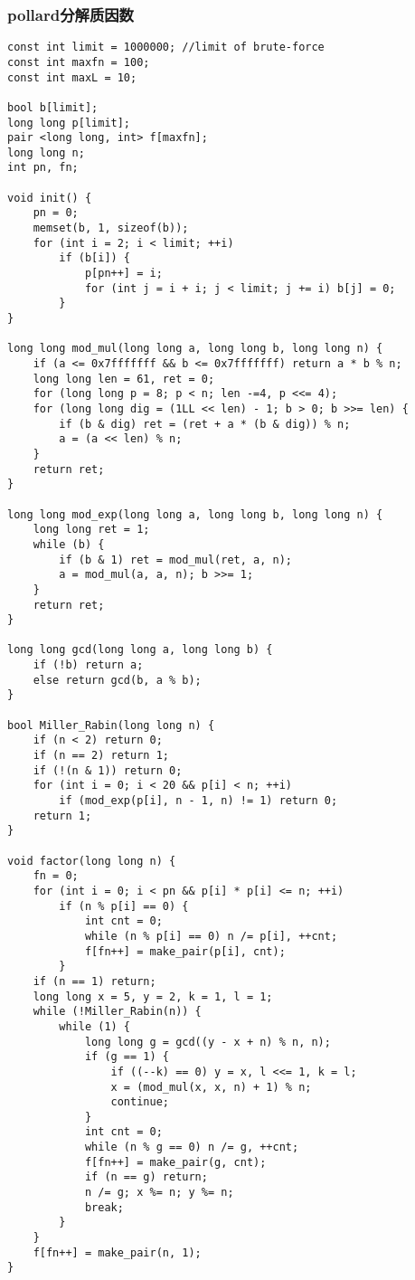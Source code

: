 \subsubsection{pollard分解质因数}
\begin{verbatim}
const int limit = 1000000; //limit of brute-force
const int maxfn = 100;
const int maxL = 10;

bool b[limit];
long long p[limit];
pair <long long, int> f[maxfn];
long long n;
int pn, fn;

void init() {
    pn = 0;
    memset(b, 1, sizeof(b));
    for (int i = 2; i < limit; ++i)
        if (b[i]) {
            p[pn++] = i;
            for (int j = i + i; j < limit; j += i) b[j] = 0;
        }
}

long long mod_mul(long long a, long long b, long long n) {
    if (a <= 0x7fffffff && b <= 0x7fffffff) return a * b % n;
    long long len = 61, ret = 0;
    for (long long p = 8; p < n; len -=4, p <<= 4);
    for (long long dig = (1LL << len) - 1; b > 0; b >>= len) {
        if (b & dig) ret = (ret + a * (b & dig)) % n;
        a = (a << len) % n;
    }
    return ret;
}

long long mod_exp(long long a, long long b, long long n) {
    long long ret = 1;
    while (b) {
        if (b & 1) ret = mod_mul(ret, a, n);
        a = mod_mul(a, a, n); b >>= 1;
    }
    return ret;
}

long long gcd(long long a, long long b) {
    if (!b) return a;
    else return gcd(b, a % b);
}

bool Miller_Rabin(long long n) {
    if (n < 2) return 0;
    if (n == 2) return 1;
    if (!(n & 1)) return 0;
    for (int i = 0; i < 20 && p[i] < n; ++i)
        if (mod_exp(p[i], n - 1, n) != 1) return 0;
    return 1;
}

void factor(long long n) {
    fn = 0;
    for (int i = 0; i < pn && p[i] * p[i] <= n; ++i)
        if (n % p[i] == 0) {
            int cnt = 0;
            while (n % p[i] == 0) n /= p[i], ++cnt;
            f[fn++] = make_pair(p[i], cnt);
        }
    if (n == 1) return;
    long long x = 5, y = 2, k = 1, l = 1;
    while (!Miller_Rabin(n)) {
        while (1) {
            long long g = gcd((y - x + n) % n, n);
            if (g == 1) {
                if ((--k) == 0) y = x, l <<= 1, k = l;
                x = (mod_mul(x, x, n) + 1) % n;
                continue;
            }
            int cnt = 0;
            while (n % g == 0) n /= g, ++cnt;
            f[fn++] = make_pair(g, cnt);
            if (n == g) return;
            n /= g; x %= n; y %= n;
            break;
        }
    }
    f[fn++] = make_pair(n, 1);
}
\end{verbatim}
